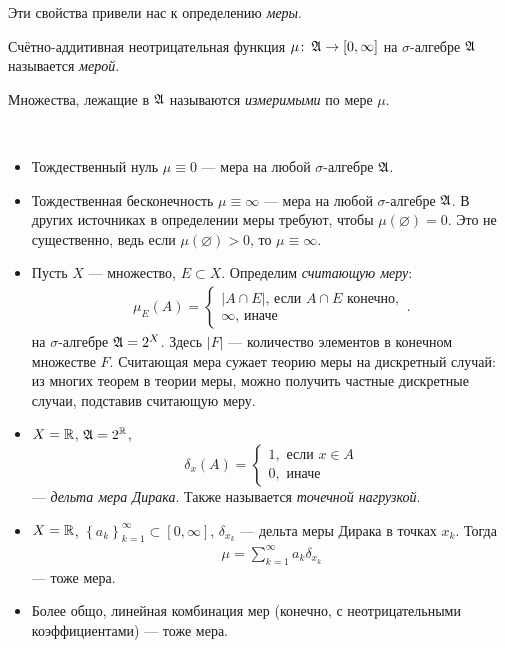 \documentclass[../measure-theory.tex]{subfiles}
\begin{document}
Эти свойства привели нас к определению \textit{меры}.

\begin{df}
 \label{definition:measure}
 Счётно-аддитивная неотрицательная функция $\mu \colon\, \mathfrak{A} \to [0,\infty] $  на $\sigma$-алгебре $\mathfrak{A}$ называется \textit{мерой}.

 Множества, лежащие в $\mathfrak{A}$ называются \textit{измеримыми} по мере $\mu$.
\end{df}
\begin{exmpl}\
 \begin{itemize}
  \item Тождественный нуль $ \mu \equiv 0 $ --- мера на любой $\sigma$-алгебре $\mathfrak{A}$.
  \item Тождественная бесконечность $ \mu \equiv \infty $ --- мера на любой $\sigma$-алгебре $\mathfrak{A}$. В других источниках в определении меры требуют, чтобы $\mu(\varnothing) = 0$. Это не существенно, ведь если $\mu(\varnothing) > 0$, то $\mu \equiv \infty$.
  \item Пусть $ X $ --- множество, $ E \subset X $. Определим \textit{считающую меру}:
   \begin{align*}
    \mu_E(A) =
    \begin{cases}
     \left| A \cap E \right| \text{, если } A \cap E \text { конечно}, \\
     \infty \text {, иначе }
    \end{cases}
   .\end{align*} на $\sigma$-алгебре $ \mathfrak{A} = 2^X $. Здесь $\left| F \right|$ --- количество элементов в конечном множестве $F$. Считающая мера сужает теорию меры на дискретный случай: из многих теорем в теории меры, можно получить частные дискретные случаи, подставив считающую меру.
  \item $ X = \mathbb{R} $, $\mathfrak{A} = 2^{\mathbb{R}}$, $$ \delta_x(A) =
   \begin{cases}
    1, \text{ если } x \in A \\
    0, \text { иначе }
   \end{cases}$$ --- \textit{дельта мера Дирака}. Также называется \textit{точечной нагрузкой}.
  \item $ X = \mathbb{R} $, $  \left\{ a_k \right\}_{k=1}^\infty \subset [0, \infty] $, $ \delta_{x_k} $ --- дельта меры Дирака в точках $ x_k $. Тогда
   \begin{align*}
    \mu = \sum_{k=1}^\infty a_k \delta_{x_k}
   \end{align*} --- тоже мера.
  \item Более общо, линейная комбинация мер (конечно, с неотрицательными коэффициентами) --- тоже мера.
 \end{itemize}
\end{exmpl}
\end{document}
